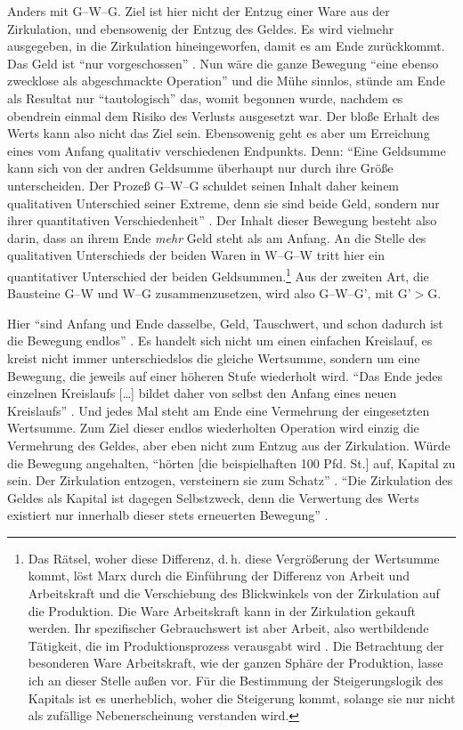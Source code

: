 \documentclass[12pt,
               DIV13,
               paper=a4,
               twoside=false,
               onehalfspacing,
               bibliography=totoc,
               toc=graduated,
               draft,
               ]{scrartcl}
\newcommand{\lips}{\dots\unkern}
\newcommand{\pc}[2]{\parencite[#1]{#2}}
\newcommand{\vgl}[2]{\parencite[vgl.][#1]{#2}}
\newcommand{\worries}[1]{\ifdraft{\textcolor{blue}{\texttt{(#1)}}}{}}
\newcommand{\gwg}{G--W--G'\xspace}
\newcommand{\wgw}{W--G--W\xspace}
\begin{document}
Anders mit G--W--G. Ziel ist hier nicht der Entzug einer Ware aus der
Zirkulation, und ebensowenig der Entzug des Geldes. Es wird vielmehr
ausgegeben, in die Zirkulation hineingeworfen, damit es am Ende
zurückkommt. Das Geld ist "`nur vorgeschossen"' \pc{163}{kap}. Nun
wäre die ganze Bewegung "`eine ebenso zwecklose als abgeschmackte
Operation"' \pc{165}{kap} und die Mühe sinnlos, stünde am Ende als
Resultat nur "`tautologisch"' \pc{164}{kap} das, womit begonnen wurde,
nachdem es obendrein einmal dem Risiko des Verlusts ausgesetzt war.
Der bloße Erhalt des Werts kann also nicht das Ziel sein. Ebensowenig
geht es aber um Erreichung eines vom Anfang qualitativ verschiedenen
Endpunkts. Denn: "`Eine Geldsumme kann sich von der andren Geldsumme
überhaupt nur durch ihre Größe unterscheiden. Der Prozeß G--W--G
schuldet seinen Inhalt daher keinem qualitativen Unterschied seiner
Extreme, denn sie sind beide Geld, sondern nur ihrer quantitativen
Verschiedenheit"' \pc{165}{kap}. Der Inhalt dieser Bewegung besteht
also darin, dass an ihrem Ende \emph{mehr} Geld steht als am Anfang.
An die Stelle des qualitativen Unterschieds der beiden Waren in \wgw
tritt hier ein quantitativer Unterschied der beiden
Geldsummen.\footnote{Das Rätsel, woher diese Differenz, d.\,h. diese
Vergrößerung der Wertsumme kommt, löst Marx durch die Einführung der
Differenz von Arbeit und Arbeitskraft und die Verschiebung des
Blickwinkels von der Zirkulation auf die Produktion. Die Ware
Arbeitskraft kann in der Zirkulation gekauft werden. Ihr spezifischer
Gebrauchswert ist aber Arbeit, also wertbildende Tätigkeit, die im
Produktionsprozess verausgabt wird \vgl{xx}{kap}. Die Betrachtung der
besonderen Ware Arbeitskraft, wie der ganzen Sphäre der Produktion,
lasse ich an dieser Stelle außen vor. Für die Bestimmung der
Steigerungslogik des Kapitals ist es unerheblich, woher die Steigerung
kommt, solange sie nur nicht als zufällige Nebenerscheinung verstanden
wird.\worries{?}} Aus der zweiten Art, die Bausteine G--W und W--G
zusammenzusetzen, wird also \gwg, mit G'$>$G.


Hier "`sind Anfang und Ende dasselbe, Geld, Tauschwert, und schon
dadurch ist die Bewegung endlos"' \pc{166}{kap}. Es handelt sich nicht
um einen einfachen Kreislauf, es kreist nicht immer unterschiedslos
die gleiche Wertsumme, sondern um eine Bewegung, die jeweils auf einer
höheren Stufe wiederholt wird. "`Das Ende jedes einzelnen Kreislaufs
[\lips] bildet daher von selbst den Anfang eines neuen Kreislaufs"'
\pc{S. 166 f.}{kap}. Und jedes Mal steht am Ende eine Vermehrung der
eingesetzten Wertsumme. Zum Ziel dieser endlos wiederholten Operation
wird einzig die Vermehrung des Geldes, aber eben nicht zum Entzug aus
der Zirkulation. Würde die Bewegung angehalten, "`hörten [die
beispielhaften 100 Pfd. St.] auf, Kapital zu sein. Der Zirkulation
entzogen, versteinern sie zum Schatz"' \pc{166}{kap}. "`Die
Zirkulation des Geldes als Kapital ist dagegen Selbstzweck, denn die
Verwertung des Werts existiert nur innerhalb dieser stets erneuerten
Bewegung"' \pc{167}{kap}.
\end{document}
